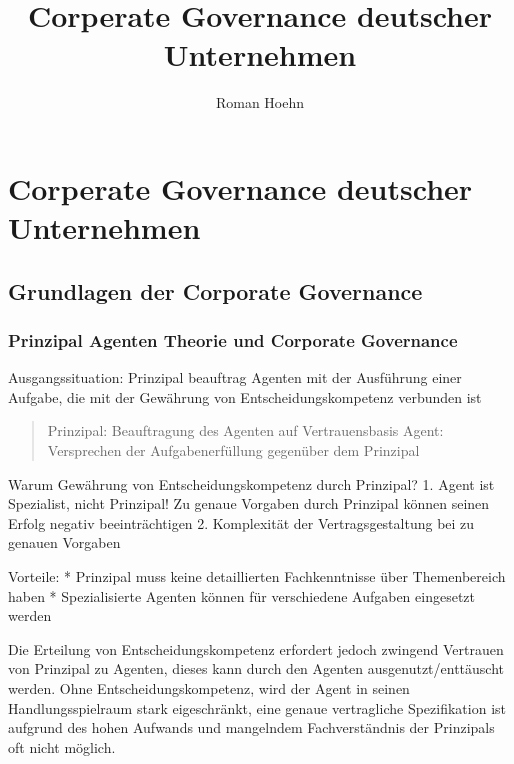\documentclass[
]{article}
\title{Corperate Governance deutscher Unternehmen}
\author{Roman Hoehn}
\date{}
\begin{document}
\maketitle

\hypertarget{corperate-governance-deutscher-unternehmen}{%
\section{Corperate Governance deutscher
Unternehmen}\label{corperate-governance-deutscher-unternehmen}}

\hypertarget{grundlagen-der-corporate-governance}{%
\subsection{Grundlagen der Corporate
Governance}\label{grundlagen-der-corporate-governance}}

\hypertarget{prinzipal-agenten-theorie-und-corporate-governance}{%
\subsubsection{Prinzipal Agenten Theorie und Corporate
Governance}\label{prinzipal-agenten-theorie-und-corporate-governance}}

Ausgangssituation: Prinzipal beauftrag Agenten mit der Ausführung einer
Aufgabe, die mit der Gewährung von Entscheidungskompetenz verbunden ist

\begin{quote}
Prinzipal: Beauftragung des Agenten auf Vertrauensbasis Agent:
Versprechen der Aufgabenerfüllung gegenüber dem Prinzipal
\end{quote}

Warum Gewährung von Entscheidungskompetenz durch Prinzipal? 1. Agent ist
Spezialist, nicht Prinzipal! Zu genaue Vorgaben durch Prinzipal können
seinen Erfolg negativ beeinträchtigen 2. Komplexität der
Vertragsgestaltung bei zu genauen Vorgaben

Vorteile: * Prinzipal muss keine detaillierten Fachkenntnisse über
Themenbereich haben * Spezialisierte Agenten können für verschiedene
Aufgaben eingesetzt werden

Die Erteilung von Entscheidungskompetenz erfordert jedoch zwingend
Vertrauen von Prinzipal zu Agenten, dieses kann durch den Agenten
ausgenutzt/enttäuscht werden. Ohne Entscheidungskompetenz, wird der
Agent in seinen Handlungsspielraum stark eigeschränkt, eine genaue
vertragliche Spezifikation ist aufgrund des hohen Aufwands und
mangelndem Fachverständnis der Prinzipals oft nicht möglich.
\end{document}
